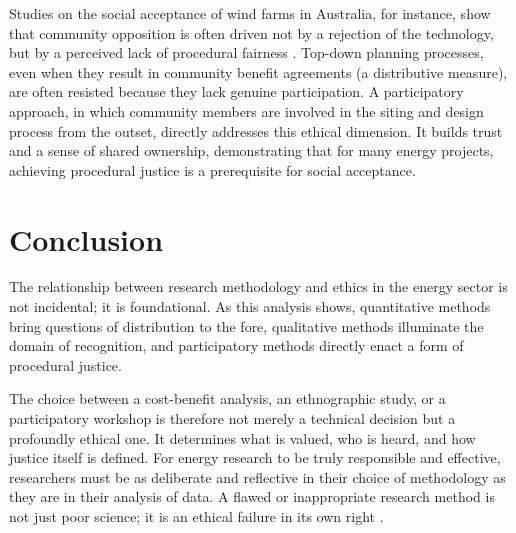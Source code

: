 \documentclass[11pt, letterpaper]{article}
\begin{document}
Studies on the social acceptance of wind farms in Australia, for instance, show that community opposition is often driven not by a rejection of the technology, but by a perceived lack of procedural fairness \citep{gross_2007}. Top-down planning processes, even when they result in community benefit agreements (a distributive measure), are often resisted because they lack genuine participation. A participatory approach, in which community members are involved in the siting and design process from the outset, directly addresses this ethical dimension. It builds trust and a sense of shared ownership, demonstrating that for many energy projects, achieving procedural justice is a prerequisite for social acceptance.

\section*{Conclusion}
The relationship between research methodology and ethics in the energy sector is not incidental; it is foundational. As this analysis shows, quantitative methods bring questions of distribution to the fore, qualitative methods illuminate the domain of recognition, and participatory methods directly enact a form of procedural justice.

The choice between a cost-benefit analysis, an ethnographic study, or a participatory workshop is therefore not merely a technical decision but a profoundly ethical one. It determines what is valued, who is heard, and how justice itself is defined. For energy research to be truly responsible and effective, researchers must be as deliberate and reflective in their choice of methodology as they are in their analysis of data. A flawed or inappropriate research method is not just poor science; it is an ethical failure in its own right \citep{wieten_2017}.



\end{document}

